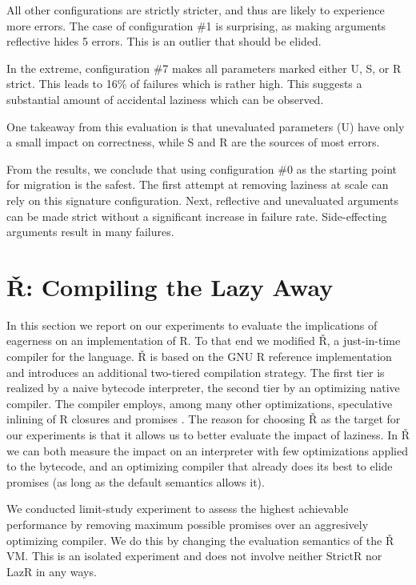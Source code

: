 \documentclass[review,creen,acmsmall]{acmart}
\newcommand{\strictr}{{\sf StrictR}\xspace}
\newcommand{\lazr}{{\sf LazR}\xspace}
\renewcommand{\Rsh}{{\sf\v R}\xspace}
\newcommand{\config}[1]{configuration \#{#1}}
\begin{document}
All other configurations are strictly stricter, and thus are likely to experience
more errors. The case of \config 1 is surprising, as making arguments reflective
hides 5 errors. This is an outlier that should be elided.

In the extreme, \config 7 makes all parameters marked either U, S, or R strict.
This leads to 16\% of failures which is rather high. This suggests a substantial
amount of accidental laziness which can be observed.

One takeaway from this evaluation is that unevaluated parameters (U) have only a
small impact on correctness, while S and R are the sources of most errors.

From the results, we conclude that using \config 0 as the starting point for
migration is the safest. The first attempt at removing laziness at scale can rely on
this signature configuration. Next, reflective and unevaluated arguments can be
made strict without a significant increase in failure rate. Side-effecting
arguments result in many failures.

\section{\Rsh: Compiling the Lazy Away}\label{sec:rsh}

In this section we report on our experiments to evaluate the implications of
eagerness on an implementation of R. To that end we modified \Rsh, a just-in-time
compiler for the language. \Rsh is based on the GNU R reference implementation
and introduces an additional two-tiered compilation strategy. The
first tier is realized by a naive bytecode interpreter, the second tier
by an optimizing native compiler. The compiler employs, among many other
optimizations, speculative inlining of R closures and promises \citep{dls19,
oopsla20c}.
The reason for choosing \Rsh as the target for our
experiments is that it allows us to better evaluate the impact of laziness. In
\Rsh we can both measure the impact on an interpreter with few optimizations
applied to the bytecode, and an optimizing compiler that already does its best
to elide promises (as long as the default semantics allows it).

We conducted limit-study experiment to assess the highest achievable performance
by removing maximum possible promises over an aggresively optimizing compiler.
We do this by changing the evaluation semantics of the \Rsh VM. This is an isolated
experiment and does not involve neither \strictr nor \lazr in any ways.
\end{document}
